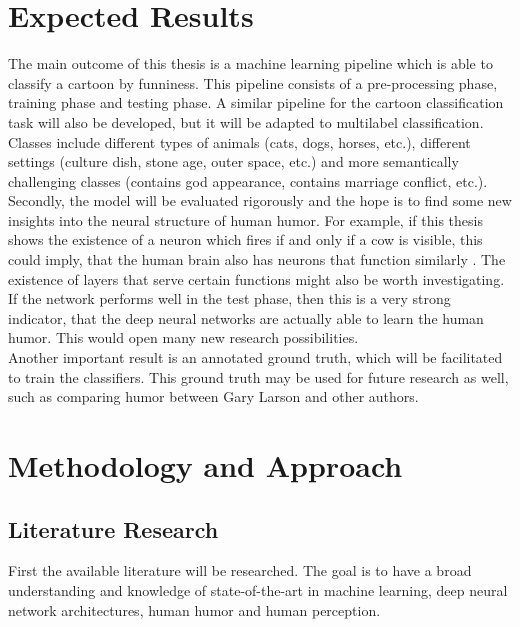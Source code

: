 \documentclass[draft,final,oneside]{vutinfth} %
\begin{document}
\chapter{Expected Results}

The main outcome of this thesis is a machine learning pipeline which is able to classify a cartoon by funniness. This pipeline consists of a pre-processing phase, training phase and testing phase. A similar pipeline for the cartoon classification task will also be developed, but it will be adapted to multilabel classification. Classes include different types of animals (cats, dogs, horses, etc.), different settings (culture dish, stone age, outer space, etc.) and more semantically challenging classes (contains god appearance, contains marriage conflict, etc.). \\

Secondly, the model will be evaluated rigorously and the hope is to find some new insights into the neural structure of human humor. For example, if this thesis shows the existence of a neuron which fires if and only if a cow is visible, this could imply, that the human brain also has neurons that function similarly \cite{Cichy2016}. The existence of layers that serve certain functions might also be worth investigating. \\

If the network performs well in the test phase, then this is a very strong indicator, that the deep neural networks are actually able to learn the human humor. This would open many new research possibilities. \\

Another important result is an annotated ground truth, which will be facilitated to train the classifiers. This ground truth may be used for future research as well, such as comparing humor between Gary Larson and other authors.

\chapter{Methodology and Approach}
\section {Literature Research}
First the available literature will be researched. The goal is to have a broad understanding and knowledge of state-of-the-art in machine learning, deep neural network architectures, human humor and human perception. \\
\end{document}
